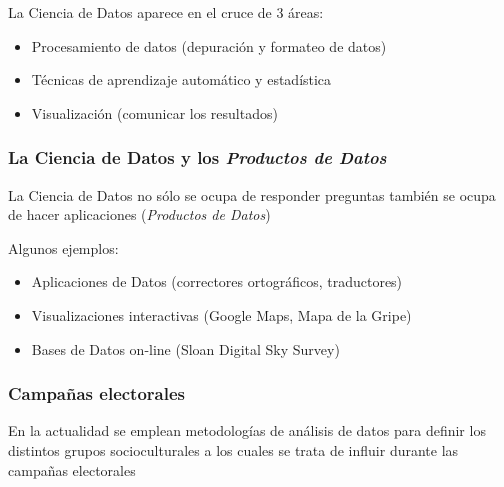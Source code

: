 \documentclass{beamer}
\begin{document}
\begin {frame}

La Ciencia de Datos aparece en el cruce de 3 \'areas:
	\begin{itemize}
	\item Procesamiento de datos (depuraci\'on y formateo de datos)
	\item T\'ecnicas de aprendizaje autom\'atico y estadística
	\item Visualizaci\'on (comunicar los resultados)
	\end{itemize}

\end{frame}

\begin {frame}

\frametitle{La Ciencia de Datos y los \emph{Productos de Datos}}

La Ciencia de Datos no s\'olo se ocupa de responder preguntas
tambi\'en se ocupa de hacer aplicaciones (\emph{Productos de Datos})

\bigskip

Algunos ejemplos:
	\begin{itemize}
	\item Aplicaciones de Datos (correctores ortogr\'aficos,
	traductores)
	\item Visualizaciones interactivas (Google Maps, Mapa de la Gripe)
	\item Bases de Datos on-line (Sloan Digital Sky Survey)
	\end{itemize}

\end{frame}


\begin{frame}

\frametitle{Campa\~nas electorales}
	En la actualidad se emplean metodolog\'ias de an\'alisis
	de datos para definir los distintos grupos socioculturales a los
	cuales se trata de influir durante las campa\~nas electorales

\end{frame}
\end{document}
